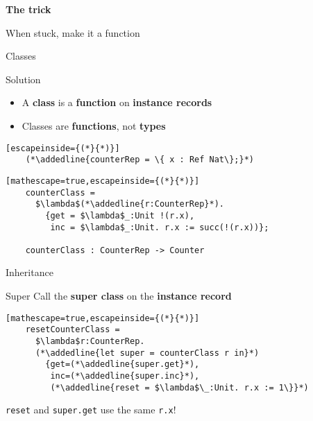 \documentclass[presentation,xcolor=svgnames]{beamer}
\begin{document}
\begin{frame}
  \begin{center}
    \huge
    \textbf{The trick}

    \regular
    When stuck, make it a function
  \end{center}
\end{frame}

\begin{frame}[fragile]{Classes}
  \begin{block}{Solution}
    \begin{itemize}
    \item A \textbf{class} is a \textbf{function} on \textbf{instance records}
    \item Classes are \textbf{functions}, not \textbf{types}
    \end{itemize}
  \end{block}
  \begin{lstlisting}[escapeinside={(*}{*)}]
    (*\addedline{counterRep = \{ x : Ref Nat\};}*)
  \end{lstlisting}
  \begin{lstlisting}[mathescape=true,escapeinside={(*}{*)}]
    counterClass =
      $\lambda$(*\addedline{r:CounterRep}*).
        {get = $\lambda$_:Unit !(r.x),
         inc = $\lambda$_:Unit. r.x := succ(!(r.x))};

    counterClass : CounterRep -> Counter
  \end{lstlisting}
\end{frame}

\begin{frame}[fragile]{Inheritance}
  \begin{block}{Super}
  Call the \textbf{super class} on the \textbf{instance record}
  \begin{lstlisting}[mathescape=true,escapeinside={(*}{*)}]
    resetCounterClass =
      $\lambda$r:CounterRep.
      (*\addedline{let super = counterClass r in}*)
        {get=(*\addedline{super.get}*),
         inc=(*\addedline{super.inc}*),
         (*\addedline{reset = $\lambda$\_:Unit. r.x := 1\}}*)
  \end{lstlisting}

  \begin{block}{}
  \texttt{reset} and \texttt{super.get} use the same \texttt{r.x}!
  \end{block}
  \end{block}
\end{frame}
\end{document}
